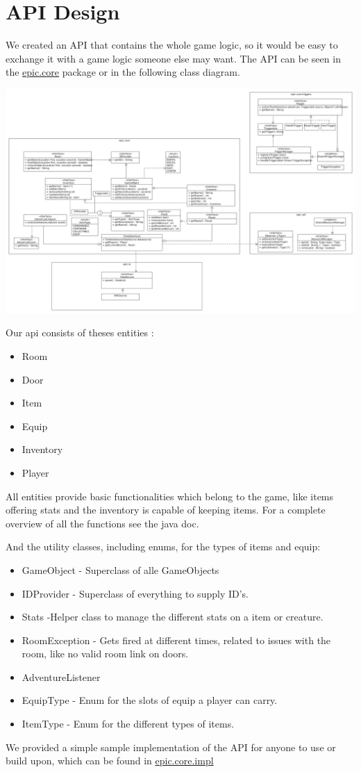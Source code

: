 \chapter{API Design}

We created an API that contains the whole game logic, so it would be easy to exchange it with a game logic someone else may want. The API can be seen in the \href{https://github.com/kerko/epic/tree/master/project/src/nl/fontys/epic/core}{epic.core} package or in the following class diagram. 

\includegraphics[scale=0.20]{assets/class-diagram.png}

Our api consists of theses entities : 
\begin{itemize}
\item Room
\item Door
\item Item
\item Equip
\item Inventory
\item Player
\end{itemize}
All entities provide basic functionalities which belong to the game, like items offering stats and the inventory is capable of keeping items. For a complete overview of all the functions see the java doc.

And the utility classes, including enums, for the types of items and equip:
\begin{itemize}
\item GameObject - Superclass of alle GameObjects 
\item IDProvider - Superclass of everything to supply ID's.
\item Stats -Helper class to manage the different stats on a item or creature.
\item RoomException - Gets fired at different times, related to issues with the room, like no valid room link on doors.
\item AdventureListener
\item EquipType - Enum for the slots of equip a player can carry.
\item ItemType -  Enum for the different types of items.
\end{itemize}


We provided a simple sample implementation of the API for anyone to use or build upon, which can be found in \href{https://github.com/kerko/epic/tree/master/project/src/nl/fontys/epic/core/impl}{epic.core.impl}


